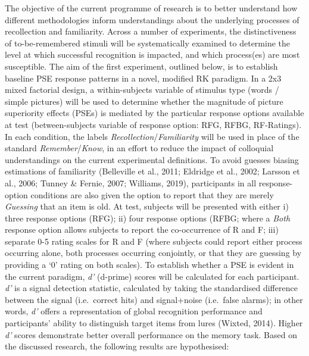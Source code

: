 \documentclass[
  11pt,
]{article}
\begin{document}
The objective of the current programme of research is to better
understand how different methodologies inform understandings about the
underlying processes of recollection and familiarity. Across a number of
experiments, the distinctiveness of to-be-remembered stimuli will be
systematically examined to determine the level at which successful
recognition is impacted, and which process(es) are most susceptible. The
aim of the first experiment, outlined below, is to establish baseline
PSE response patterns in a novel, modified RK paradigm. In a 2x3 mixed
factorial design, a within-subjects variable of stimulus type (words /
simple pictures) will be used to determine whether the magnitude of
picture superiority effects (PSEs) is mediated by the particular
response options available at test (between-subjects variable of
response option: RFG, RFBG, RF-Ratings). In each condition, the labels
\emph{Recollection}/\emph{Familiarity} will be used in place of the
standard \emph{Remember}/\emph{Know}, in an effort to reduce the impact
of colloquial understandings on the current experimental definitions. To
avoid guesses biasing estimations of familiarity (Belleville et al.,
2011; Eldridge et al., 2002; Larsson et al., 2006; Tunney \& Fernie,
2007; Williams, 2019), participants in all response-option conditions
are also given the option to report that they are merely \emph{Guessing}
that an item is old. At test, subjects will be presented with either i)
three response options (RFG); ii) four response options (RFBG; where a
\emph{Both} response option allows subjects to report the co-occurrence
of R and F; iii) separate 0-5 rating scales for R and F (where subjects
could report either process occurring alone, both processes occurring
conjointly, or that they are guessing by providing a `0' rating on both
scales). To establish whether a PSE is evident in the current paradigm,
\emph{d'} (d-prime) scores will be calculated for each participant.
\emph{d'} is a signal detection statistic, calculated by taking the
standardised difference between the signal (i.e.~correct hits) and
signal+noise (i.e.~false alarms); in other words, \emph{d'} offers a
representation of global recognition performance and participants'
ability to distinguish target items from lures (Wixted, 2014). Higher
\emph{d'} scores demonstrate better overall performance on the memory
task. Based on the discussed research, the following results are
hypothesised:
\end{document}
